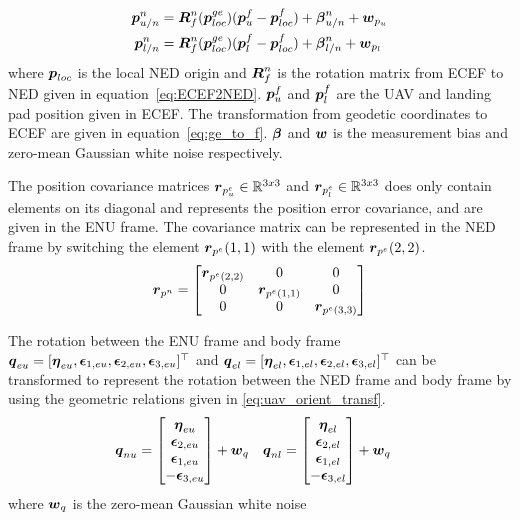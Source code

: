\begin{align}
  \boldsymbol{p}^n_{u/n}&=\boldsymbol{R}_{f}^n(\boldsymbol{p}^{ge}_{loc})(\boldsymbol{p}_u^f-\boldsymbol{p}_{loc}^f)+\boldsymbol{\beta}_{u/n}^{n}+\boldsymbol{w}_{p_u}\label{eq:uav_pos_transf} \\
  \boldsymbol{p}^n_{l/n}&=\boldsymbol{R}_{f}^n(\boldsymbol{p}^{ge}_{loc})(\boldsymbol{p}_l^f-\boldsymbol{p}_{loc}^f)+\boldsymbol{\beta}_{l/n}^{n}+\boldsymbol{w}_{p_l}\label{eq:lp_pos_transf}
\end{align}
where $\boldsymbol{p}_{loc}$ is the local NED origin and $\boldsymbol{R}_{f}^n$ is the rotation matrix from ECEF to NED given in equation~\ref{eq:ECEF2NED}. $\boldsymbol{p}_u^f$ and $\boldsymbol{p}_l^f$ are the \gls{UAV} and landing pad position given in ECEF. The transformation from geodetic coordinates to ECEF are given in equation~\ref{eq:ge_to_f}. $\boldsymbol{\beta}$ and $\boldsymbol{w}$ is the measurement bias and zero-mean Gaussian white noise respectively.

The position covariance matrices $\boldsymbol{r}_{p_u^e}\in \mathbb{R}^{3x3}$ and $\boldsymbol{r}_{p_l^e}\in \mathbb{R}^{3x3}$ does only contain elements on its diagonal and represents the position error covariance, and are given in the ENU frame. The covariance matrix can be represented in the NED frame by switching the element $\boldsymbol{r}_{p^e}(1,1)$ with the element $\boldsymbol{r}_{p^e}(2,2)$.
\begin{equation}
  \boldsymbol{r}_{p^n}=
  \begin{bmatrix}
    \boldsymbol{r}_{p^e(2,2)} & 0 & 0\\
    0 & \boldsymbol{r}_{p^e(1,1)} & 0\\
    0 & 0 & \boldsymbol{r}_{p^e(3,3)}\\
  \end{bmatrix}
\end{equation}

The rotation between the ENU frame and body frame $\boldsymbol{q}_{eu}=[\boldsymbol{\eta}_{eu},\boldsymbol{\epsilon}_{1,eu},\boldsymbol{\epsilon}_{2,eu},\boldsymbol{\epsilon}_{3,eu}]^{\top}$ and $\boldsymbol{q}_{el}=[\boldsymbol{\eta}_{el},\boldsymbol{\epsilon}_{1,el},\boldsymbol{\epsilon}_{2,el},\boldsymbol{\epsilon}_{3,el}]^{\top}$ can be transformed to represent the rotation between the NED frame and body frame by using the geometric relations given in \ref{eq:uav_orient_transf}.
\begin{align}
\label{eq:uav_orient_transf}
  \boldsymbol{q}_{nu}&=
  \begin{bmatrix}
    \boldsymbol{\eta}_{eu}\\
    \boldsymbol{\epsilon}_{2,eu}\\
    \boldsymbol{\epsilon}_{1,eu}\\
    -\boldsymbol{\epsilon}_{3,eu}
  \end{bmatrix}
  +\boldsymbol{w}_q
  &
  \boldsymbol{q}_{nl}&=
  \begin{bmatrix}
    \boldsymbol{\eta}_{el}\\
    \boldsymbol{\epsilon}_{2,el}\\
    \boldsymbol{\epsilon}_{1,el}\\
    -\boldsymbol{\epsilon}_{3,el}
  \end{bmatrix}
  +\boldsymbol{w}_q
\end{align}
where $\boldsymbol{w}_q$ is the zero-mean Gaussian white noise

